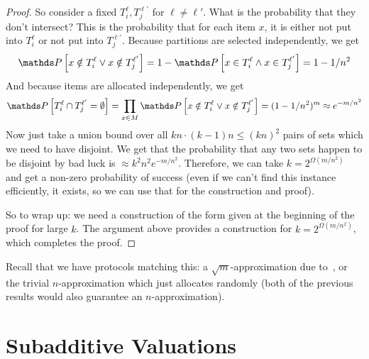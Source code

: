 \begin{proof}
    So consider a fixed $T_i^\ell, T_j^{\ell'}$ for $\ell\ne\ell'$.
    What is the probability that they don't intersect?
    This is the probability that for each item $x$, it is either
    not put into $T_i^\ell$ or not put into $T_j^{\ell'}$.
    Because partitions are selected independently, we get
    \begin{align*}
      \P{x\notin T_i^\ell \vee x\notin T_j^{\ell'}}
        = 1 - \P{x\in T_i^\ell \wedge x\in T_j^{\ell'}}
        = 1 - 1/n^2
    \end{align*}
    And because items are allocated independently, we get 
    \begin{align*}
      \P{ T_i^\ell \cap T_j^{\ell'} = \emptyset} 
      = \prod_{x\in M} \P{x\notin T_i^\ell \vee x\notin T_j^{\ell'}}
      = (1 - 1/n^2)^m
      \approx e^{-m/n^2}
    \end{align*}
    Now just take a union bound over all $kn\cdot(k-1)n\le (kn)^2$ 
    pairs of sets which we need to have disjoint.
    We get that the probability that any two sets happen to be
    disjoint by bad luck is $\approx k^2n^2 e^{-m/n^2}$. Therefore, we can take $k =
    2^{\Omega(m/n^2)}$ and get a non-zero probability of success (even if we can't
    find this instance efficiently, it exists, so we can use that for the
    construction and proof). 

    So to wrap up: we need a construction of the form given
    at the beginning of the proof
    for large $k$. The argument above provides a construction for $k =
    2^{\Omega(m/n^2)}$, which completes the proof.
  \end{proof}

  Recall that we have protocols matching this: a $\sqrt{m}$-approximation due
  to~\cite{LaviS05, DobzinskiNS05}, or the trivial $n$-approximation which just
  allocates randomly (both of the previous results would also guarantee an
  $n$-approximation). 

\section{Subadditive Valuations} 

